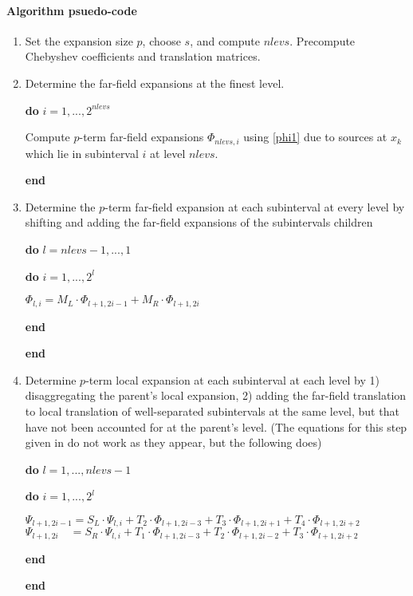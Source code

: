 \paragraph{Algorithm psuedo-code}
\begin{enumerate}
\item Set the expansion size $p$, choose $s$, and compute $nlevs$.  Precompute Chebyshev coefficients and translation matrices.  

\item Determine the far-field expansions at the finest level. 

\textbf{do} $i = 1, ..., 2^{nlevs}$
\begin{addmargin}[1em]{2em}
Compute $p$-term far-field expansions $\Phi_{nlevs,i}$ using \eqref{phi1} due to sources at $x_k$ which lie in subinterval $i$ at level $nlevs$. 
\end{addmargin}
\textbf{end}

\item Determine the $p$-term far-field expansion at each subinterval at every level by shifting and adding the far-field expansions of the subintervals children

\textbf{do} $l = nlevs-1, ..., 1$
\begin{addmargin}[1em]{2em}
\textbf{do} $i = 1, ..., 2^{l}$
\begin{addmargin}[1em]{2em}
$\Phi_{l,i} = M_L \cdot \Phi_{l+1,2i-1}  + M_R \cdot \Phi_{l+1,2i} $
\end{addmargin}
\textbf{end}
\end{addmargin}
\textbf{end}

\item Determine $p$-term local expansion at each subinterval at each level by 1) disaggregating the parent's local expansion, 2) adding the far-field translation to local translation of well-separated subintervals at the same level, but that have not been accounted for at the parent's level. (The equations for this step given in \cite{dutt1996fast} do not work as they appear, but the following does)

\textbf{do} $l = 1,...,nlevs-1$
\begin{addmargin}[1em]{1em}
\textbf{do} $i = 1, ..., 2^{l}$
\begin{addmargin}[1em]{1em}
$\Psi_{l+1,2i-1} = S_L \cdot  \Psi_{l,i} + T_2 \cdot  \Phi_{l+1,2i-3} + T_3  \cdot \Phi_{l+1,2i+1} + T_4 \cdot  \Phi_{l+1,2i+2}$
$\Psi_{l+1,2i} \quad = S_R  \cdot \Psi_{l,i} + T_1 \cdot  \Phi_{l+1,2i-3} + T_2  \cdot \Phi_{l+1,2i-2} + T_3  \cdot \Phi_{l+1,2i+2}$
\end{addmargin}
\textbf{end}
\end{addmargin}
\textbf{end}


\end{enumerate}
